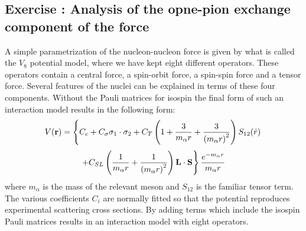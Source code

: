 \documentclass[%
oneside,                 %
final,                   %
10pt]{article}
\newenvironment{doconceexercise}{}{}
\newcounter{doconceexercisecounter}
\begin{document}
\begin{doconceexercise}

\subsection*{Exercise \thedoconceexercisecounter: Analysis of the opne-pion exchange component of the force}


A simple parametrization of the nucleon-nucleon force is given by what is called the $V_8$ potential model,
where we have kept eight different operators. These operators contain a central force, a spin-orbit force,
a spin-spin force and a tensor force. Several features of the nuclei can be explained in terms of these four components. Without the Pauli matrices for isospin the final form of such an interaction model results in the following form: 
\[
V(\mathbf{r})= \left\{ C_c + C_\mathbf{\sigma} \mathbf{\sigma}_1\cdot\mathbf{\sigma}_2
 + C_T \left( 1 + {3\over m_\alpha r} + {3\over\left(m_\alpha r\right)^2}\right) S_{12} (\hat r)\right. 
\]
\[
\left. + C_{SL} \left( {1\over m_\alpha r} + {1\over \left( m_\alpha r\right)^2}
\right) \mathbf{L}\cdot \mathbf{S}
\right\} \frac{e^{-m_\alpha r}}{m_\alpha r}
\]
where $m_{\alpha}$ is the mass of the relevant meson and
$S_{12}$ is the familiar tensor term. The various coefficients $C_i$ are normally fitted so that the potential reproduces experimental scattering cross sections. By adding terms which include the isospin Pauli matrices 
results in an interaction model with eight operators.


\end{doconceexercise}
\end{document}
